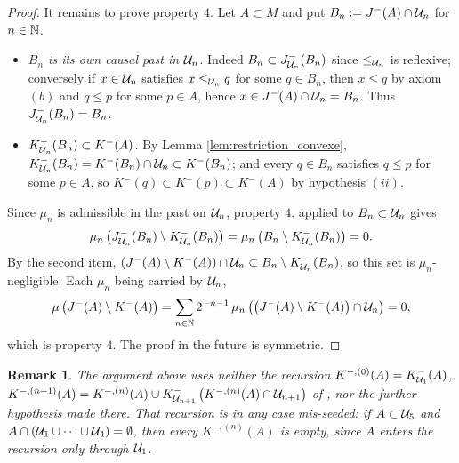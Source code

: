 \documentclass[a4paper,twoside]{article}
\newtheorem{rem}[lem]{Remark}
\begin{document}
\begin{proof}
It remains to prove property $4.$ Let $A\subset M$ and put $B_n:=J^-(A)\cap \mathcal{U}_n$ for $n\in \mathbb{N}$.
\begin{itemize}
\item \emph{$B_n$ is its own causal past in $\mathcal{U}_n$.} Indeed $B_n\subset J^-_{\mathcal{U}_n}(B_n)$ since
$\leq_{\mathcal{U}_n}$ is reflexive; conversely if $x\in \mathcal{U}_n$ satisfies $x\leq_{\mathcal{U}_n}q$ for some $q\in B_n$,
then $x\leq q$ by axiom $(b)$ and $q\leq p$ for some $p\in A$, hence $x\in J^-(A)\cap \mathcal{U}_n=B_n$.
Thus $J^-_{\mathcal{U}_n}(B_n)=B_n$.
\item \emph{$K^-_{\mathcal{U}_n}(B_n)\subset K^-(A)$.} By Lemma \ref{lem:restriction_convexe},
$K^-_{\mathcal{U}_n}(B_n)=K^-(B_n)\cap \mathcal{U}_n\subset K^-(B_n)$; and every $q\in B_n$ satisfies $q\leq p$ for
some $p\in A$, so $K^-(q)\subset K^-(p)\subset K^-(A)$ by hypothesis $(ii)$.
\end{itemize}
Since $\mu_n$ is admissible in the past on $\mathcal{U}_n$, property $4.$ applied to $B_n\subset \mathcal{U}_n$ gives
$$\mu_n\left(J^-_{\mathcal{U}_n}(B_n)\setminus K^-_{\mathcal{U}_n}(B_n)\right)=\mu_n\left(B_n\setminus K^-_{\mathcal{U}_n}(B_n)\right)=0 .$$
By the second item, $\left(J^-(A)\setminus K^-(A)\right)\cap \mathcal{U}_n\subset B_n\setminus K^-_{\mathcal{U}_n}(B_n)$,
so this set is $\mu_n$-negligible. Each $\mu_n$ being carried by $\mathcal{U}_n$,
$$\mu\left(J^-(A)\setminus K^-(A)\right)=\sum_{n\in \mathbb{N}}2^{-n-1}\,\mu_n\left(\left(J^-(A)\setminus K^-(A)\right)\cap \mathcal{U}_n\right)=0,$$
which is property $4.$ The proof in the future is symmetric.
\end{proof}
\begin{rem}\label{rem:recursion_these}
The argument above uses neither the recursion
$K^{-,(0)}(A)=K^-_{\mathcal{U}_1}(A)$, $K^{-,(n+1)}(A)=K^{-,(n)}(A)\cup K^-_{\mathcal{U}_{n+1}}\left(K^{-,(n)}(A)\cap \mathcal{U}_{n+1}\right)$
of \cite{thesis}, nor the further hypothesis made there. That recursion is in any case mis-seeded:
if $A\subset \mathcal{U}_5$ and $A\cap\left(\mathcal{U}_1\cup\cdots\cup \mathcal{U}_4\right)=\emptyset$, then every
$K^{-,(n)}(A)$ is empty, since $A$ enters the recursion only through $\mathcal{U}_1$.
\end{rem}
\end{document}
